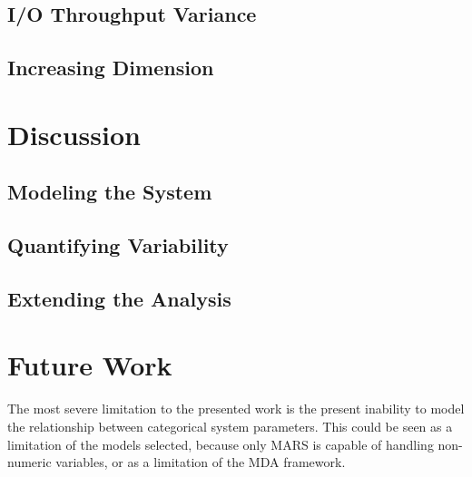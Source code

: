 \documentclass{scspaperproc}
\theoremstyle{scsthe}
\begin{document}
\subsection{I/O Throughput Variance}
\subsection{Increasing Dimension}


\section{Discussion}
\subsection{Modeling the System}
\subsection{Quantifying Variability}
\subsection{Extending the Analysis}

\section{Future Work}
The most severe limitation to the presented work is the present
inability to model the relationship between categorical system
parameters. This could be seen as a limitation of the models selected,
because only MARS is capable of handling non-numeric variables, or as
a limitation of the MDA framework.




\end{document}
